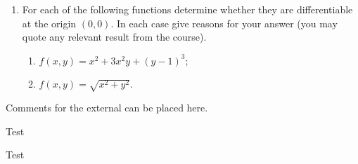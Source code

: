 \documentclass{exams}
\begin{document}
\begin{examcomp1}
\begin{question}
\begin{enumerate}
\item For each of the following functions determine whether they are
differentiable at the origin $(0,0)$. In each case give reasons for your
answer (you may quote any relevant result from the course).

\begin{enumerate}
\item $f(x,y) = x^2 + 3x^2y + (y-1)^3$;
\item $f(x,y) = \sqrt{x^2+y^2}$.
\end{enumerate}
\end{enumerate}
\end{question}


%
\end{examcomp1}


Comments for the external can be placed here.


\begin{solution}

Test

\end{solution}

\begin{solution}

Test

\end{solution}
\end{document}

